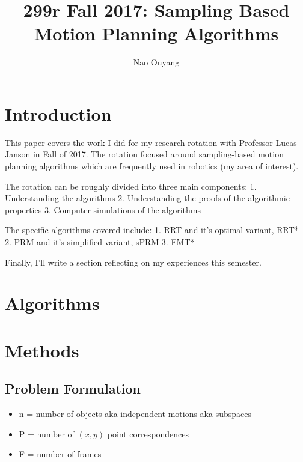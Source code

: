 \documentclass[a4paper]{article}
\title{299r Fall 2017: Sampling Based Motion Planning Algorithms}
\author{Nao Ouyang}
\begin{document}
\maketitle

\begin{abstract} 

\end{abstract}

\section{Introduction}

This paper covers the work I did for my research rotation with
Professor Lucas Janson in Fall of 2017. The rotation focused around
sampling-based motion planning algorithms which are frequently used in
robotics (my area of interest). 

The rotation can be roughly divided into three main components:
1. Understanding the algorithms
2. Understanding the proofs of the algorithmic properties
3. Computer simulations of the algorithms 


The specific algorithms covered include:
1. RRT and it's optimal variant, RRT*
2. PRM and it's simplified variant, sPRM
3. FMT*

Finally, I'll write a section reflecting on my experiences this semester.

\section{Algorithms}



\section{Methods}


\subsection{Problem Formulation}

\newcommand{\matx}[1]{\mbox{\tt #1}}
\newcommand{\vect}[1]{{\bf #1}}

\begin{itemize}
\item n = number of objects aka independent motions aka subspaces
\item P = number of $(x, y)$ point correspondences
\item F = number of frames
\end{itemize}
\end{document}
